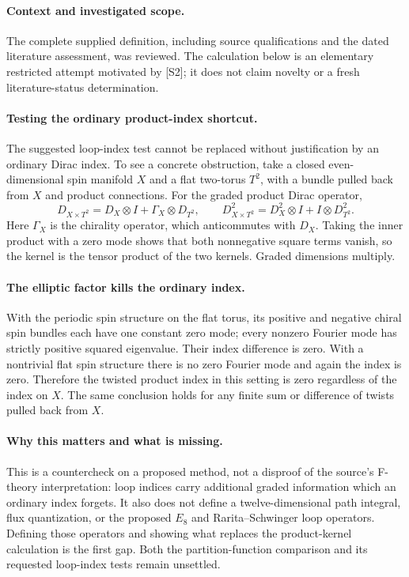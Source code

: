 \documentclass[11pt]{article}
\begin{document}
\paragraph{Context and investigated scope.} The complete supplied definition, including source qualifications and the dated literature assessment, was reviewed. The calculation below is an elementary restricted attempt motivated by [S2]; it does not claim novelty or a fresh literature-status determination.

\paragraph{Testing the ordinary product-index shortcut.} The suggested loop-index test cannot be replaced without justification by an ordinary Dirac index. To see a concrete obstruction, take a closed even-dimensional spin manifold $X$ and a flat two-torus $T^2$, with a bundle pulled back from $X$ and product connections. For the graded product Dirac operator,
\[
 D_{X\times T^2}=D_X\otimes I+\Gamma_X\otimes D_{T^2},\qquad
 D_{X\times T^2}^2=D_X^2\otimes I+I\otimes D_{T^2}^2.
\]
Here $\Gamma_X$ is the chirality operator, which anticommutes with $D_X$. Taking the inner product with a zero mode shows that both nonnegative square terms vanish, so the kernel is the tensor product of the two kernels. Graded dimensions multiply.

\paragraph{The elliptic factor kills the ordinary index.} With the periodic spin structure on the flat torus, its positive and negative chiral spin bundles each have one constant zero mode; every nonzero Fourier mode has strictly positive squared eigenvalue. Their index difference is zero. With a nontrivial flat spin structure there is no zero Fourier mode and again the index is zero. Therefore the twisted product index in this setting is zero regardless of the index on $X$. The same conclusion holds for any finite sum or difference of twists pulled back from $X$.

\paragraph{Why this matters and what is missing.} This is a countercheck on a proposed method, not a disproof of the source's F-theory interpretation: loop indices carry additional graded information which an ordinary index forgets. It also does not define a twelve-dimensional path integral, flux quantization, or the proposed $E_8$ and Rarita--Schwinger loop operators. Defining those operators and showing what replaces the product-kernel calculation is the first gap. Both the partition-function comparison and its requested loop-index tests remain unsettled.
\end{document}
